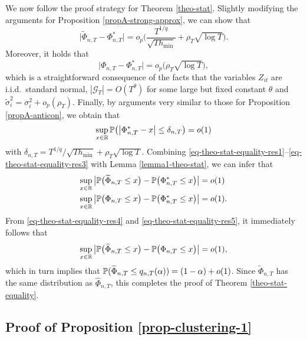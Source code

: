 \documentclass[a4paper,12pt]{article}
\begin{document}
We now follow the proof strategy for Theorem \ref{theo-stat}. Slightly modifying the arguments for Proposition \ref{propA-strong-approx}, we can show that 
\begin{equation}\label{eq-theo-stat-equality-res1}
\big| \widetilde{\Phi}_{n,T} - \Phi_{n,T}^* \big| = o_p \Big( \frac{T^{1/q}}{\sqrt{T h_{\min}}} + \rho_T \sqrt{\log T} \Big). 
\end{equation}
Moreover, it holds that 
\begin{equation}\label{eq-theo-stat-equality-res2}
\big| \Phi_{n,T} - \Phi_{n,T}^* \big| = o_p \big( \rho_T \sqrt{\log T} \big), 
\end{equation}
which is a straightforward consequence of the facts that the variables $Z_{it}$ are i.i.d.\ standard normal, $|\mathcal{G}_T| = O(T^\theta)$ for some large but fixed constant $\theta$ and $\widetilde{\sigma}_i^2 = \sigma_i^2 + o_p(\rho_T)$. Finally, by arguments very similar to those for Proposition \ref{propA-anticon}, we obtain that 
\begin{equation}\label{eq-theo-stat-equality-res3}
\sup_{x \in \mathbb{R}} \mathbb{P} \big( \big| \Phi_{n,T}^* - x \big| \le \delta_{n,T} \big) = o(1) 
\end{equation}
with $\delta_{n,T} = T^{1/q} / \sqrt{T h_{\min}} + \rho_T \sqrt{\log T}$. Combining \eqref{eq-theo-stat-equality-res1}--\eqref{eq-theo-stat-equality-res3} with Lemma \ref{lemma1-theo-stat}, we can infer that 
\begin{align}
\sup_{x \in \mathbb{R}} \big| \mathbb{P} \big( \widetilde{\Phi}_{n,T} \le x \big) -  \mathbb{P} \big( \Phi_{n,T}^* \le x \big) \big| & = o(1) \label{eq-theo-stat-equality-res4} \\
\sup_{x \in \mathbb{R}} \big| \mathbb{P} \big( \Phi_{n,T} \le x \big) -  \mathbb{P} \big( \Phi_{n,T}^* \le x \big) \big| & = o(1). \label{eq-theo-stat-equality-res5}
\end{align}
From \eqref{eq-theo-stat-equality-res4} and \eqref{eq-theo-stat-equality-res5}, it immediately follows that 
\[ \sup_{x \in \mathbb{R}} \big| \mathbb{P} \big( \widetilde{\Phi}_{n,T} \le x \big) -  \mathbb{P} \big( \Phi_{n,T} \le x \big) \big| = o(1), \]
which in turn implies that $\mathbb{P} ( \widetilde{\Phi}_{n,T} \le q_{n,T}(\alpha) ) = (1 - \alpha) + o(1)$. Since $\widetilde{\Phi}_{n,T}$ has the same distribution as $\widehat{\Phi}_{n,T}$, this completes the proof of Theorem \ref{theo-stat-equality}. 



\subsection*{Proof of Proposition \ref{prop-clustering-1}}
\end{document}
